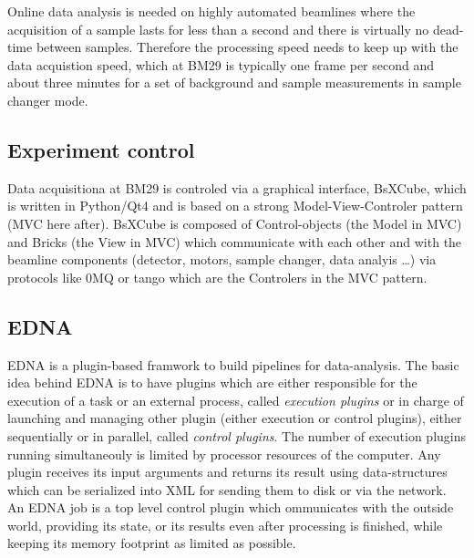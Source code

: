 \documentclass[preprint,pdf]{iucr}              %
\begin{document}
Online data analysis is needed on highly automated beamlines where the
acquisition of a sample lasts for less than a second and there is virtually no
dead-time between samples. Therefore the processing speed needs to keep up with the data acquistion speed, which at BM29 is typically one frame per second and about three minutes for a set of background and sample measurements in sample changer mode.


\subsection{Experiment control}
Data acquisitiona at BM29 is controled via a graphical interface, BsXCube, which is
written in Python/Qt4 \cite{pyqt} and is based on a strong Model-View-Controler
pattern (MVC here after)\cite{mvc}.
BsXCube is composed of Control-objects (the Model in MVC) and Bricks (the
View in MVC) which communicate with each other and with the beamline components
(detector, motors, sample changer, data analyis \ldots) via protocols like 0MQ\cite{zmq} or
tango\cite{tango} which are the Controlers in the MVC pattern.




\subsection{EDNA} 
EDNA is a plugin-based framwork to build pipelines for
data-analysis. The basic idea behind EDNA is to have plugins which are either responsible for the execution
of a task or an external process, called \textit{execution plugins} or in charge of launching and managing other
plugin (either execution or control plugins), either sequentially or in
parallel, called \textit{control plugins}.
The number of execution plugins running simultaneouly is limited by processor resources of the computer.
Any plugin receives its input arguments and returns its result using data-structures which can be serialized
into XML for sending them to disk or via the network. \\

An EDNA job is a top level control plugin which ommunicates with the outside world, providing its state,
or its results even after processing is finished, while keeping its memory footprint as limited as possible. 
\end{document}
